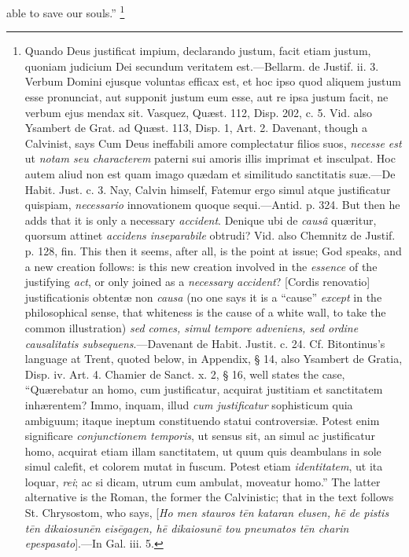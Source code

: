 able to save our souls.'' \footnote{Quando Deus
justificat impium, declarando justum, facit etiam justum, quoniam
judicium Dei secundum veritatem est.—Bellarm. de Justif. ii. 3.
Verbum Domini ejusque voluntas efficax est, et hoc ipso quod aliquem
justum esse pronunciat, aut supponit justum eum esse, aut re ipsa
justum facit, ne verbum ejus mendax sit. Vasquez, Quæst. 112, Disp.
202, c. 5. Vid. also Ysambert de Grat. ad Quæst. 113, Disp. 1, Art.
2. Davenant, though a Calvinist, says Cum Deus ineffabili amore
complectatur filios suos, \emph{necesse est} ut \emph{notam seu
characterem} paterni sui amoris illis imprimat et insculpat. Hoc
autem aliud non est quam imago quædam et similitudo sanctitatis suæ.—De
Habit. Just. c. 3. Nay, Calvin himself, Fatemur ergo simul atque
justificatur quispiam, \emph{necessario} innovationem quoque sequi.—Antid.
p. 324. But then he adds that it is only a necessary \emph{accident}.
Denique ubi de \emph{causâ} quæritur, quorsum attinet \emph{accidens
inseparabile} obtrudi? Vid. also Chemnitz de Justif. p. 128, fin.
This then it seems, after all, is the point at issue; God speaks, and
a new creation follows: is this new creation involved in the \emph{essence}
of the justifying \emph{act}, or only joined as a \emph{necessary
accident}? [Cordis renovatio] justificationis obtentæ non \emph{causa}
(no one says it is a ``cause'' \emph{except} in the
philosophical sense, that whiteness is the cause of a white wall, to
take the common illustration) \emph{sed comes, simul tempore adveniens,
sed ordine causalitatis subsequens}.—Davenant de Habit. Justit.
c. 24. Cf. Bitontinus's language at Trent, quoted below, in Appendix,
§ 14, also Ysambert de Gratia, Disp. iv. Art. 4. Chamier de Sanct. x.
2, § 16, well states the case, ``Quærebatur an homo, cum
justificatur, acquirat justitiam et sanctitatem inhærentem? Immo,
inquam, illud \emph{cum justificatur} sophisticum quia ambiguum;
itaque ineptum constituendo statui controversiæ. Potest enim
significare \emph{conjunctionem temporis}, ut sensus sit, an simul ac
justificatur homo, acquirat etiam illam sanctitatem, ut quum quis
deambulans in sole simul calefit, et colorem mutat in fuscum. Potest
etiam \emph{identitatem}, ut ita loquar, \emph{rei}; ac si dicam,
utrum cum ambulat, moveatur homo.'' The latter alternative is the
Roman, the former the Calvinistic; that in the text follows St.
Chrysostom, who says, [\emph{Ho men stauros t\={e}n kataran elusen, h\={e}
de pistis t\={e}n dikaiosun\={e}n eis\={e}gagen, h\={e}
dikaiosun\={e} tou pneumatos t\={e}n charin epespasato}].—In
Gal. iii. 5.}

